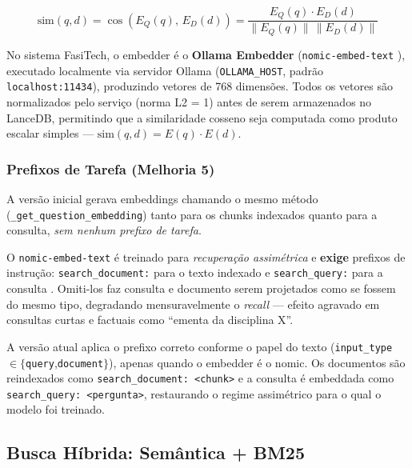 \documentclass[12pt,a4paper]{report}
\begin{document}
\begin{equation}
  \text{sim}(q, d) = \cos\!\left(E_Q(q),\, E_D(d)\right)
  = \frac{E_Q(q) \cdot E_D(d)}{\|E_Q(q)\|\,\|E_D(d)\|}
  \label{eq:cosine}
\end{equation}

No sistema FasiTech, o embedder é o \textbf{Ollama Embedder}
(\texttt{nomic-embed-text} \autocite{nussbaum2024nomic}), executado localmente via servidor Ollama
\autocite{ollama2023}
(\texttt{OLLAMA\_HOST}, padrão \texttt{localhost:11434}), produzindo
vetores de 768 dimensões. Todos os vetores são normalizados pelo
serviço (norma L2 = 1) antes de serem armazenados no LanceDB,
permitindo que a similaridade cosseno seja computada como produto
escalar simples — $\text{sim}(q,d) = E(q) \cdot E(d)$.

\subsubsection{Prefixos de Tarefa (Melhoria 5)}
\label{sec:melhoria5}

\begin{historico}
A versão inicial gerava embeddings chamando o mesmo método
(\texttt{\_get\_question\_embedding}) tanto para os chunks indexados quanto
para a consulta, \emph{sem nenhum prefixo de tarefa}.
\end{historico}

\begin{problema}
O \texttt{nomic-embed-text} é treinado para \emph{recuperação assimétrica} e
\textbf{exige} prefixos de instrução: \texttt{search\_document:} para o texto
indexado e \texttt{search\_query:} para a consulta \autocite{nussbaum2024nomic}.
Omiti-los faz consulta e documento serem projetados como se fossem do mesmo
tipo, degradando mensuravelmente o \textit{recall} — efeito agravado em
consultas curtas e factuais como ``ementa da disciplina X''.
\end{problema}

A versão atual aplica o prefixo correto conforme o papel do texto
(\texttt{input\_type} $\in \{$\texttt{query},\texttt{document}$\}$), apenas quando o
embedder é o nomic. Os documentos são reindexados como
\texttt{search\_document: <chunk>} e a consulta é embeddada como
\texttt{search\_query: <pergunta>}, restaurando o regime assimétrico para o
qual o modelo foi treinado.

\subsection{Busca Híbrida: Semântica + BM25}
\label{sec:rrf-hist}
\end{document}
